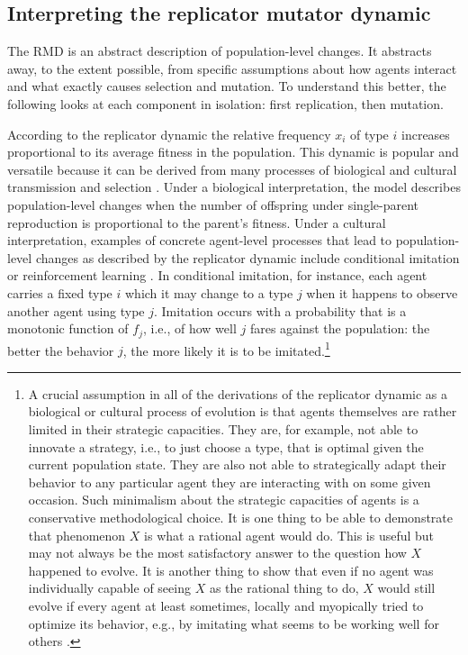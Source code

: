 \documentclass[a4paper, 11pt]{article}
\theoremstyle{Satz}
\begin{document}
\subsection{Interpreting the replicator mutator dynamic}

The RMD is an abstract description of population-level changes. It abstracts away, to the
extent possible, from specific assumptions about how agents interact and what exactly causes
selection and mutation. To understand this better, the following looks at each component in
isolation: first replication, then mutation.

According to the replicator dynamic the relative frequency $x_i$ of type $i$ increases
proportional to its average fitness in the population. This dynamic is popular and versatile
because it can be derived from many processes of biological and cultural transmission and
selection \citep[for overview and several derivations
see][]{Sandholm2010:Population-Game}. Under a biological interpretation, the model describes
population-level changes when the number of offspring under single-parent reproduction is
proportional to the parent's fitness. Under a cultural interpretation, examples of concrete
agent-level processes that lead to population-level changes as described by the replicator
dynamic include conditional imitation
\citep[e.g.,][]{Helbing1996:A-Stochastic-Be,Schlag1998:Why-Imitate-and} or reinforcement
learning \citep[e.g.,][]{BorgersSarin997:Learning-Throug,Beggs2005:On-the-Converge}. In
conditional imitation, for instance, each agent carries a fixed type $i$ which it may change to
a type $j$ when it happens to observe another agent using type $j$. Imitation occurs with a
probability that is a monotonic function of $f_j$, i.e., of how well $j$ fares against the
population: the better the behavior $j$, the more likely it is to be imitated.\footnote{A
  crucial assumption in all of the derivations of the replicator dynamic as a biological or
  cultural process of evolution is that agents themselves are rather limited in their strategic
  capacities. They are, for example, not able to innovate a strategy, i.e., to just choose a
  type, that is optimal given the current population state. They are also not able to
  strategically adapt their behavior to any particular agent they are interacting with on some
  given occasion. Such minimalism about the strategic capacities of agents is a conservative
  methodological choice. It is one thing to be able to demonstrate that phenomenon $X$ is what
  a rational agent would do. This is useful but may not always be the most satisfactory answer
  to the question how $X$ happened to evolve. It is another thing to show that even if no agent
  was individually capable of seeing $X$ as the rational thing to do, $X$ would still evolve if
  every agent at least sometimes, locally and myopically tried to optimize its behavior, e.g.,
  by imitating what seems to be working well for others \citep{Skyrms2010:Signals}.}
\end{document}
